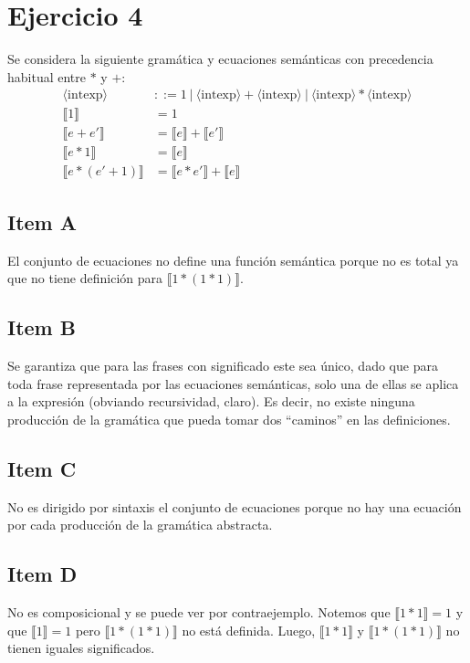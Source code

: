 \documentclass{article}
\newcommand{\aexp}[1]{\langle\text{#1}\rangle}
\newcommand{\intexp}{\aexp{intexp}}
\newcommand{\sem}[1]{\llbracket #1\rrbracket}
\begin{document}
\section*{Ejercicio 4}
Se considera la siguiente gramática y ecuaciones semánticas con precedencia habitual entre $*$ y $+$:
\begin{equation*}
	\begin{aligned}
		\intexp        & ::= 1\ |\ \intexp + \intexp\ |\ \intexp * \intexp \\
		\sem{1}        & = 1                                               \\
		\sem{e+e'}     & = \sem{e}+\sem{e'}                                \\
		\sem{e*1}      & = \sem{e}                                         \\
		\sem{e*(e'+1)} & = \sem{e*e'}+\sem{e}
	\end{aligned}
\end{equation*}

\subsection*{Item A}
El conjunto de ecuaciones no define una función semántica porque no es total ya que no tiene definición para $\sem{1*(1*1)}$.

\subsection*{Item B}
Se garantiza que para las frases con significado este sea único, dado que para toda frase representada por las ecuaciones semánticas, solo una de ellas se aplica a la expresión (obviando recursividad, claro).
Es decir, no existe ninguna producción de la gramática que pueda tomar dos ``caminos'' en las definiciones.

\subsection*{Item C}
No es dirigido por sintaxis el conjunto de ecuaciones porque no hay una ecuación por cada producción de la gramática abstracta.

\subsection*{Item D}
No es composicional y se puede ver por contraejemplo.
Notemos que $\sem{1*1}=1$ y que $\sem{1}=1$ pero $\sem{1*(1*1)}$ no está definida.
Luego, $\sem{1*1}$ y $\sem{1*(1*1)}$ no tienen iguales significados.
\end{document}
